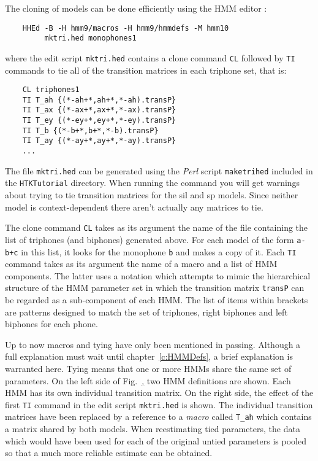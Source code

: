 The cloning of models can be done efficiently using the HMM editor :
\begin{verbatim}
    HHEd -B -H hmm9/macros -H hmm9/hmmdefs -M hmm10 
         mktri.hed monophones1
\end{verbatim}
where the edit script \texttt{mktri.hed}
contains a clone command \texttt{CL} followed by \texttt{TI} commands to tie all of
the transition matrices in each triphone set, that is:
\begin{verbatim}
    CL triphones1
    TI T_ah {(*-ah+*,ah+*,*-ah).transP}
    TI T_ax {(*-ax+*,ax+*,*-ax).transP}
    TI T_ey {(*-ey+*,ey+*,*-ey).transP}
    TI T_b {(*-b+*,b+*,*-b).transP}
    TI T_ay {(*-ay+*,ay+*,*-ay).transP}
    ...
\end{verbatim}  
The file \texttt{mktri.hed} can be generated using the {\em Perl} script
\texttt{maketrihed} included in the \texttt{HTKTutorial} directory.
When running the  command you
will get warnings about trying to tie transition matrices for the sil
and sp models. Since neither model is context-dependent there aren't
actually any matrices to tie.

The clone command \texttt{CL} takes as its
argument the name of the file containing the list of triphones (and
biphones) generated
above.  For each model of the form \texttt{a-b+c} in this list, it looks for
the monophone \texttt{b} and makes a copy of it. Each \texttt{TI} command takes as its argument the name of a macro
and a list of HMM components.  The latter uses a notation which attempts to
mimic the hierarchical structure of the HMM parameter set in which the
transition matrix \texttt{transP} can be regarded as a sub-component of each
HMM.  The list of items within brackets are patterns designed to match the set
of triphones, right biphones and left biphones for each phone.


Up to now macros and tying have only been mentioned in passing.  Although a
full explanation must wait until chapter~\ref{c:HMMDefs}, a brief explanation
is warranted here.  Tying means that one or more HMMs share the same set of
parameters.  On the left side of Fig.~\href{f:egtranstie}, two HMM definitions
are shown.  Each HMM has its own individual transition matrix.  On the right
side, the effect of the first \texttt{TI} command in the edit script
\texttt{mktri.hed} is shown.  The individual transition matrices have been
replaced by a reference to a \textit{macro} called \texttt{T\_ah} which
contains a matrix shared by both models.  When reestimating tied parameters,
the data which would have been used for each of the original untied parameters
is pooled so that a much more reliable estimate can be obtained.

